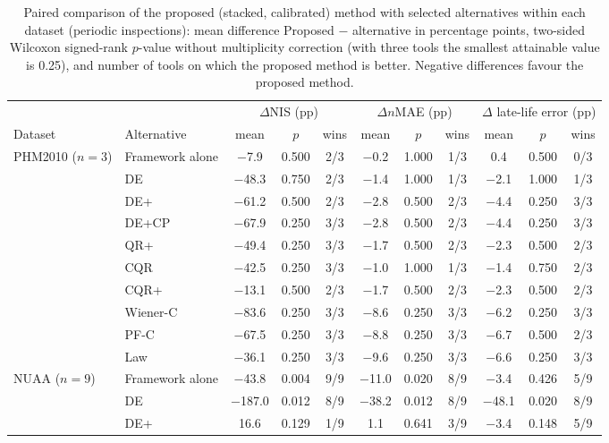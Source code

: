 \begin{table}[!tbp]
\centering
\caption{Paired comparison of the proposed (stacked, calibrated) method with selected alternatives within each dataset (periodic inspections): mean difference Proposed $-$ alternative in percentage points, two-sided Wilcoxon signed-rank $p$-value without multiplicity correction (with three tools the smallest attainable value is 0.25), and number of tools on which the proposed method is better. Negative differences favour the proposed method.}
\label{tab:Ssignif_ds}
\footnotesize\setlength{\tabcolsep}{3pt}
\begin{tabular}{llccccccccc}
\toprule
 & & \multicolumn{3}{c}{$\Delta$NIS (pp)} & \multicolumn{3}{c}{$\Delta n$MAE (pp)} & \multicolumn{3}{c}{$\Delta$ late-life error (pp)}\\
\cmidrule(lr){3-5}\cmidrule(lr){6-8}\cmidrule(lr){9-11}
Dataset & Alternative & mean & $p$ & wins & mean & $p$ & wins & mean & $p$ & wins\\
\midrule
PHM2010 ($n=3$) & Framework alone & $-$7.9 & 0.500 & 2/3 & $-$0.2 & 1.000 & 1/3 & 0.4 & 0.500 & 0/3\\
 & DE & $-$48.3 & 0.750 & 2/3 & $-$1.4 & 1.000 & 1/3 & $-$2.1 & 1.000 & 1/3\\
 & DE+ & $-$61.2 & 0.500 & 2/3 & $-$2.8 & 0.500 & 2/3 & $-$4.4 & 0.250 & 3/3\\
 & DE+CP & $-$67.9 & 0.250 & 3/3 & $-$2.8 & 0.500 & 2/3 & $-$4.4 & 0.250 & 3/3\\
 & QR+ & $-$49.4 & 0.250 & 3/3 & $-$1.7 & 0.500 & 2/3 & $-$2.3 & 0.500 & 2/3\\
 & CQR & $-$42.5 & 0.250 & 3/3 & $-$1.0 & 1.000 & 1/3 & $-$1.4 & 0.750 & 2/3\\
 & CQR+ & $-$13.1 & 0.500 & 2/3 & $-$1.7 & 0.500 & 2/3 & $-$2.3 & 0.500 & 2/3\\
 & Wiener-C & $-$83.6 & 0.250 & 3/3 & $-$8.6 & 0.250 & 3/3 & $-$6.2 & 0.250 & 3/3\\
 & PF-C & $-$67.5 & 0.250 & 3/3 & $-$8.8 & 0.250 & 3/3 & $-$6.7 & 0.500 & 2/3\\
 & Law & $-$36.1 & 0.250 & 3/3 & $-$9.6 & 0.250 & 3/3 & $-$6.6 & 0.250 & 3/3\\
\midrule
NUAA ($n=9$) & Framework alone & $-$43.8 & 0.004 & 9/9 & $-$11.0 & 0.020 & 8/9 & $-$3.4 & 0.426 & 5/9\\
 & DE & $-$187.0 & 0.012 & 8/9 & $-$38.2 & 0.012 & 8/9 & $-$48.1 & 0.020 & 8/9\\
 & DE+ & 16.6 & 0.129 & 1/9 & 1.1 & 0.641 & 3/9 & $-$3.4 & 0.148 & 5/9\\

\end{tabular}
\end{table}
